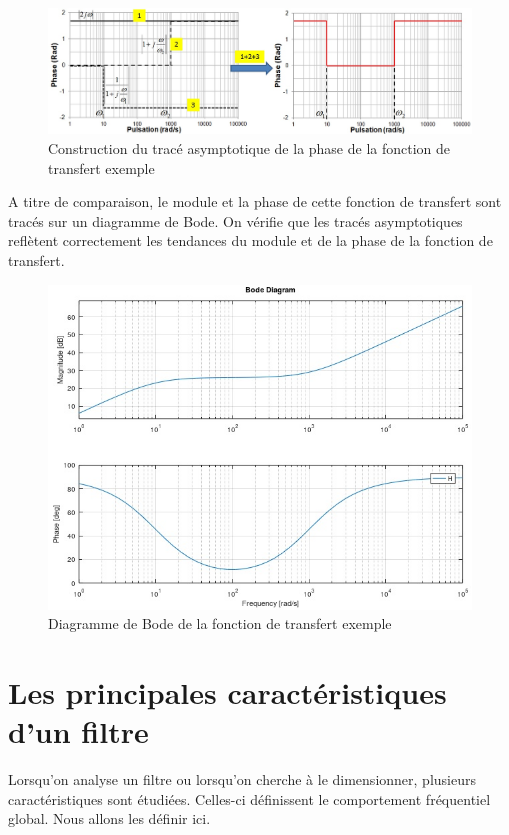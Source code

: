  	\begin{figure}[h!]
 		\centering
 		\includegraphics[scale=0.5]{images/Constr_trace_asympt_Phase.jpg}
 		\caption{Construction du tracé asymptotique de la phase de la fonction de transfert exemple}	
 		\label{Fig:Construction_trace_asympt_phase} 
 	\end{figure}
 
 	A titre de comparaison, le module et la phase de cette fonction de transfert sont tracés sur un diagramme de Bode. On vérifie que les tracés asymptotiques reflètent correctement les tendances du module et de la phase de la fonction de transfert.
 	
 	\begin{figure}[h!]
 		\centering
 		\includegraphics[scale=0.7]{images/Diag_Bode_Exemple_Octave.jpg}
 		\caption{Diagramme de Bode de la fonction de transfert exemple}	
 		\label{Fig:Diag_Bode_TF_exemple} 
 	\end{figure}
 
 	
	\vspace{1\baselineskip}


	\section{Les principales caractéristiques d'un filtre}
	Lorsqu'on analyse un filtre ou lorsqu'on cherche à le dimensionner, plusieurs caractéristiques sont étudiées. Celles-ci définissent le comportement fréquentiel global. Nous allons les définir ici. 
	
